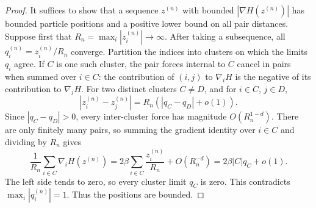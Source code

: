 \documentclass[12pt,reqno,letterpaper]{amsart}
\theoremstyle{definition}
\theoremstyle{remark}
\numberwithin{equation}{section}
\newcommand{\be}{\beta}
\begin{document}
\begin{proof}
It suffices to show that a sequence \(z^{(n)}\) with bounded
\(|\nabla H(z^{(n)})|\) has bounded particle positions and a positive lower
bound on all pair distances.  Suppose first that
\(R_n=\max_i|z_i^{(n)}|\to\infty\).  After taking a subsequence, all
\(q_i^{(n)}=z_i^{(n)}/R_n\) converge.  Partition the indices into clusters
on which the limits \(q_i\) agree.  If \(C\) is one such cluster, the
pair forces internal to \(C\) cancel in pairs when summed over \(i\in C\):
the contribution of \((i,j)\) to \(\nabla_iH\) is the negative of its
contribution to \(\nabla_jH\).  For two distinct clusters \(C\ne D\), and
for \(i\in C\), \(j\in D\),
\begin{equation*}
 |z_i^{(n)}-z_j^{(n)}|
 =R_n(|q_C-q_D|+o(1)).
\end{equation*}
Since \(|q_C-q_D|>0\), every inter-cluster force has magnitude
\(O(R_n^{1-d})\).  There are only finitely many pairs, so summing the
gradient identity over \(i\in C\) and dividing by \(R_n\) gives
\begin{equation*}
 \frac1{R_n}\sum_{i\in C}\nabla_iH(z^{(n)})
 =2\be\sum_{i\in C}\frac{z_i^{(n)}}{R_n}+O(R_n^{-d})
 =2\be|C|q_C+o(1).
\end{equation*}
The left side tends to zero, so every cluster limit \(q_C\) is zero.  This
contradicts \(\max_i|q_i^{(n)}|=1\).  Thus the positions are bounded.


\end{proof}
\end{document}
